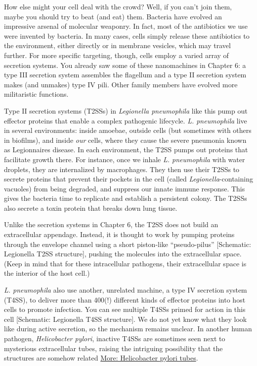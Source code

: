 \documentclass[]{tufte-book}
\begin{document}
How else might your cell deal with the crowd? Well, if you can't join them, maybe you should try to beat (and eat) them. Bacteria have evolved an impressive arsenal of molecular weaponry. In fact, most of the antibiotics we use were invented by bacteria. In many cases, cells simply release these antibiotics to the environment, either directly or in membrane vesicles, which may travel further. For more specific targeting, though, cells employ a varied array of secretion systems. You already saw some of these nanomachines in Chapter 6: a type III secretion system assembles the flagellum and a type II secretion system makes (and unmakes) type IV pili. Other family members have evolved more militaristic functions.

Type II secretion systems (T2SSs) in \emph{Legionella pneumophila} like this pump out effector proteins that enable a complex pathogenic lifecycle. \emph{L. pneumophila} live in several environments: inside amoebae, outside cells (but sometimes with others in biofilms), and inside \emph{our} cells, where they cause the severe pneumonia known as Legionnaires disease. In each environment, the T2SS pumps out proteins that facilitate growth there. For instance, once we inhale \emph{L. pneumophila} with water droplets, they are internalized by macrophages. They then use their T2SSs to secrete proteins that prevent their pockets in the cell (called \emph{Legionella}-containing vacuoles) from being degraded, and suppress our innate immune response. This gives the bacteria time to replicate and establish a persistent colony. The T2SSs also secrete a toxin protein that breaks down lung tissue.

Unlike the secretion systems in Chapter 6, the T2SS does not build an extracellular appendage. Instead, it is thought to work by pumping proteins through the envelope channel using a short piston-like ``pseudo-pilus'' {[}Schematic: Legionella T2SS structure{]}, pushing the molecules into the extracellular space. (Keep in mind that for these intracellular pathogens, their extracellular space is the interior of the host cell.)

\emph{L. pneumophila} also use another, unrelated machine, a type IV secretion system (T4SS), to deliver more than 400(!) different kinds of effector proteins into host cells to promote infection. You can see multiple T4SSs primed for action in this cell {[}Schematic: Legionella T4SS structure{]}. We do not yet know what they look like during active secretion, so the mechanism remains unclear. In another human pathogen, \emph{Helicobacter pylori}, inactive T4SSs are sometimes seen next to mysterious extracellular tubes, raising the intriguing possibility that the structures are somehow related \protect\hyperlink{Helicobacter_pylori_tubes}{More: Helicobacter pylori tubes}.
\end{document}
